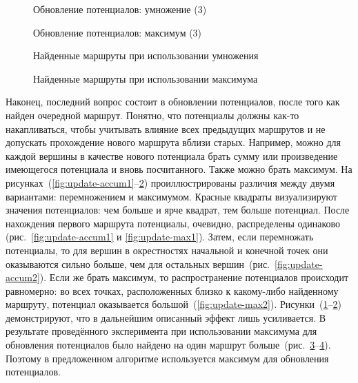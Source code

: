 \begin{figure}
    \caption{Обновление потенциалов: умножение (3)}
    \label{fig:update-accum3}
\end{figure}

\begin{figure}
    \caption{Обновление потенциалов: максимум (3)}
    \label{fig:update-max3}
\end{figure}

\begin{figure}
    \caption{Найденные маршруты при использовании умножения}
    \label{fig:update-accum-result}
\end{figure}

\begin{figure}
    \caption{Найденные маршруты при использовании максимума}
    \label{fig:update-max-result}
\end{figure}

Наконец, последний вопрос состоит в обновлении потенциалов, после того
как найден очередной маршрут. Понятно, что потенциалы должны как-то
накапливаться, чтобы учитывать влияние всех предыдущих маршрутов и не
допускать прохождение нового маршрута вблизи старых. Например, можно
для каждой вершины в качестве нового потенциала брать сумму или
произведение имеющегося потенциала и вновь посчитанного. Также можно
брать максимум. На
рисунках~(\ref{fig:update-accum1}--\ref{fig:update-max3})
проиллюстрированы различия между двумя вариантами: перемножением и
максимумом. Красные квадраты визуализируют значения потенциалов: чем
больше и ярче квадрат, тем больше потенциал. После нахождения первого
маршрута потенциалы, очевидно, распределены одинаково
(рис.~\ref{fig:update-accum1} и \ref{fig:update-max1}). Затем, если
перемножать потенциалы, то для вершин в окрестностях начальной и
конечной точек они оказываются сильно больше, чем для остальных
вершин~(рис.~\ref{fig:update-accum2}). Если же брать максимум, то
распространение потенциалов происходит равномерно: во всех точках,
расположенных близко к какому-либо найденному маршруту, потенциал
оказывается большой~(\ref{fig:update-max2}).
Рисунки~(\ref{fig:update-accum3}--\ref{fig:update-max3})
демонстрируют, что в дальнейшим описанный эффект лишь усиливается. В
результате проведённого эксперимента при использовании максимума для
обновления потенциалов было найдено на один маршрут
больше~(рис.~\ref{fig:update-accum-result}--\ref{fig:update-max-result}).
Поэтому в предложенном алгоритме используется максимум для обновления
потенциалов.

\FloatBarrier

